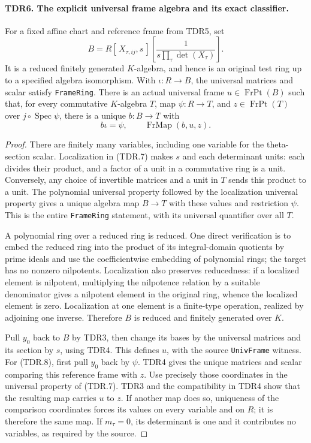 \paragraph{TDR6. The explicit universal frame algebra and its exact classifier.}
\label{claim:TDR6}
For a fixed affine chart and reference frame from TDR5, set
\[
 B=R[\,X_{\tau,ij},s\,]
       \left[\frac{1}{s\prod_\tau\det(X_\tau)}\right].       \tag{TDR.7}
\]
It is a reduced finitely generated \(K\)-algebra, and hence is an
original test ring up to a specified algebra isomorphism.  With
\(\iota:R\to B\), the universal matrices and scalar satisfy
\texttt{FrameRing}.  There is an actual universal frame
\(u\in\operatorname{FrPt}(B)\) such that, for every commutative
\(K\)-algebra \(T\), map \(\psi:R\to T\), and
\(z\in\operatorname{FrPt}(T)\) over \(j\circ\operatorname{Spec}\psi\),
there is a unique \(b:B\to T\) with
\[
 b\iota=\psi,\qquad\operatorname{FrMap}(b,u,z).             \tag{TDR.8}
\]

\begin{proof}
There are finitely many variables, including one variable for the
theta-section scalar.  Localization in (TDR.7) makes \(s\) and
each determinant units: each divides their product, and a factor
of a unit in a commutative ring is a unit.  Conversely, any choice
of invertible matrices and a unit in \(T\) sends this product to
a unit.  The polynomial universal property followed by the
localization universal property gives a unique algebra map
\(B\to T\) with these values and restriction \(\psi\).
This is the entire \texttt{FrameRing} statement, with its
universal quantifier over all \(T\).

A polynomial ring over a reduced ring is reduced.  One direct
verification is to embed the reduced ring into the product of
its integral-domain quotients by prime ideals and use the
coefficientwise embedding of polynomial rings; the target has no
nonzero nilpotents.  Localization also preserves reducedness:
if a localized element is nilpotent, multiplying the nilpotence
relation by a suitable denominator gives a nilpotent element in
the original ring, whence the localized element is zero.
Localization at one element is a finite-type operation, realized
by adjoining one inverse.  Therefore \(B\) is reduced and
finitely generated over \(K\).

Pull \(y_0\) back to \(B\) by TDR3, then change its bases by
the universal matrices and its section by \(s\), using TDR4.
This defines \(u\), with the source \texttt{UnivFrame} witness.
For (TDR.8), first pull \(y_0\) back by \(\psi\).  TDR4
gives the unique matrices and scalar comparing this reference
frame with \(z\).  Use precisely those coordinates in the
universal property of (TDR.7).  TDR3 and the compatibility in
TDR4 show that the resulting map carries \(u\) to \(z\).
If another map does so, uniqueness of the comparison coordinates
forces its values on every variable and on \(R\); it is therefore
the same map.  If \(m_\tau=0\), its determinant is one and it
contributes no variables, as required by the source.
\end{proof}

